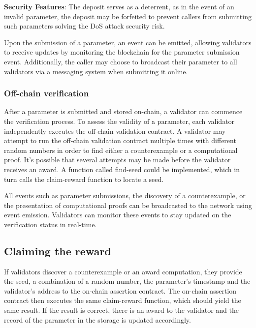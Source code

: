 \documentclass[runningheads]{llncs}
\begin{document}
\textbf{Security Features}: 
The deposit serves as a deterrent, as in the event of an invalid parameter, the deposit may be forfeited to prevent callers from submitting such parameters solving the DoS attack security risk. 

Upon the submission of a parameter, an event can be emitted, allowing validators to receive updates by monitoring the blockchain for the parameter submission event. Additionally, the caller may choose to broadcast their parameter to all validators via a messaging system when submitting it online.

\subsubsection{Off-chain verification}

After a parameter is submitted and stored on-chain, a validator can commence the verification process. To assess the validity of a parameter, each validator independently executes the off-chain validation contract. A validator may attempt to run the off-chain validation contract multiple times with different random numbers in order to find either a counterexample or a computational proof. It's possible that several attempts may be made before the validator receives an award.  A function called find-seed could be implemented, which in turn calls the claim-reward function to locate a seed.

All events such as parameter submissions, the discovery of a counterexample, or the presentation of computational proofs can be broadcasted to the network using event emission. Validators can monitor these events to stay updated on the verification status in real-time. 

\subsection{Claiming the reward} 
If validators discover a counterexample or an award computation, they provide the seed, a combination of a random number, the parameter's timestamp and the validator's address to the on-chain assertion contract. The on-chain assertion contract then executes the same claim-reward function, which should yield the same result.  If the result is correct, there is an award to the validator and the record of the parameter in the storage is updated accordingly. %
\end{document}
